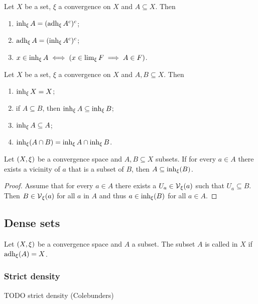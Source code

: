\begin{lemma}
Let $X$ be a set, $\xi$ a convergence on $X$ and $A \subseteq X$. Then
\begin{enumerate}
\item $\operatorname{inh}_\xi A = (\operatorname{adh}_\xi A^c)^c$;
\item $\operatorname{adh}_\xi A = (\operatorname{inh}_\xi A^c)^c$;
\item $x\in \operatorname{inh}_\xi A \iff (x\in \lim_\xi F \implies A\in F)$.
\end{enumerate}
\end{lemma}

\begin{proposition}
Let $X$ be a set, $\xi$ a convergence on $X$ and $A,B \subseteq X$. Then
\begin{enumerate}
\item $\operatorname{inh}_\xi X = X$;
\item if $A \subseteq B$, then $\operatorname{inh}_\xi A \subseteq \operatorname{inh}_\xi B$;
\item $\operatorname{inh}_\xi A\subseteq A$;
\item $\operatorname{inh}_\xi(A\cap B) = \operatorname{inh}_\xi A \cap \operatorname{inh}_\xi B$.
\end{enumerate}
\end{proposition}

\begin{lemma} \label{subsetWithVicinitiesInInherence}
Let $\left( X,\xi \right)$ be a convergence space and $A,B\subseteq X$ subsets. If for every $a\in A$ there exists a vicinity of $a$ that is a subset of $B$, then $A\subseteq \operatorname{inh}_\xi(B)$.
\end{lemma}
\begin{proof}
Assume that for every $a\in A$ there exists a $U_a \in \operatorname{\mathcal{V}}_\xi(a)$ such that $U_a \subseteq B$. Then $B\in \operatorname{\mathcal{V}}_\xi(a)$ for all $a$ in $A$ and thus $a\in \operatorname{inh}_\xi(B)$ for all $a\in A$.
\end{proof}


\subsection{Dense sets}
\begin{definition}
Let $\left( X, \xi \right)$ be a convergence space and $A$ a subset. The subset $A$ is called  in $X$ if $\operatorname{adh}_\xi(A) = X$.
\end{definition}

\subsubsection{Strict density}
TODO strict density (Colebunders)

